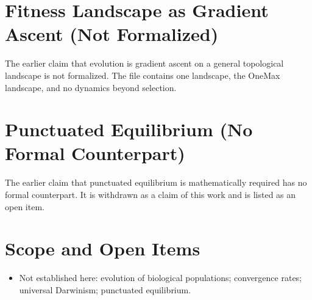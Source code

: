 \documentclass[11pt, a4paper]{article}
\begin{document}
\section{Fitness Landscape as Gradient Ascent (Not Formalized)}
The earlier claim that evolution is gradient ascent on a general topological landscape is not formalized. The file contains one landscape, the OneMax landscape, and no dynamics beyond selection.

\section{Punctuated Equilibrium (No Formal Counterpart)}
The earlier claim that punctuated equilibrium is mathematically required has no formal counterpart. It is withdrawn as a claim of this work and is listed as an open item.

\section{Scope and Open Items}
\begin{itemize}
  \item Not established here: evolution of biological populations; convergence rates; universal Darwinism; punctuated equilibrium.
\end{itemize}
\end{document}
